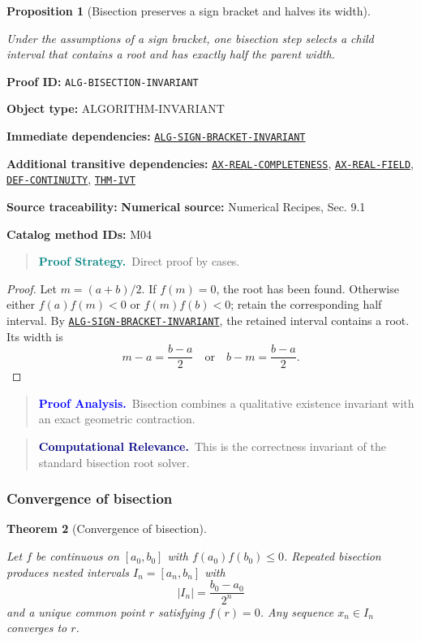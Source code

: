 \documentclass[10pt]{article}
\newcommand{\pidraw}[1]{\begingroup\urlstyle{tt}\nolinkurl{#1}\endgroup}
\newcommand{\pidref}[1]{\hyperref[prf:#1]{\pidraw{#1}}}
\newcommand{\pid}[1]{\pidref{#1}}
\newtheorem{theorem}{Theorem}[section]
\newtheorem{proposition}[theorem]{Proposition}
\theoremstyle{definition}
\theoremstyle{remark}
\newenvironment{proofstrategy}
{\begin{quote}\small\noindent\textbf{\textcolor{teal}{Proof Strategy.}}\ }
{\end{quote}}
\newenvironment{proofanalysis}
{\begin{quote}\small\noindent\textbf{\textcolor{blue}{Proof Analysis.}}\ }
{\end{quote}}
\newenvironment{computationalrelevance}
{\begin{quote}\small\noindent\textbf{\textcolor{navy}{Computational Relevance.}}\ }
{\end{quote}}
\newcommand{\meta}[2]{\noindent\textbf{#1:} #2\par}
\begin{document}
\begin{proposition}[Bisection preserves a sign bracket and halves its width]\label{prf:ALG-BISECTION-INVARIANT}

Under the assumptions of a sign bracket, one bisection step selects a child interval that contains a root and has exactly half the parent width.

\end{proposition}

\meta{Proof ID}{\pidraw{ALG-BISECTION-INVARIANT}}
\meta{Object type}{ALGORITHM-INVARIANT}
\meta{Immediate dependencies}{\pidref{ALG-SIGN-BRACKET-INVARIANT}}
\meta{Additional transitive dependencies}{\pidref{AX-REAL-COMPLETENESS}, \pidref{AX-REAL-FIELD}, \pidref{DEF-CONTINUITY}, \pidref{THM-IVT}}
\meta{Source traceability}{\textbf{Numerical source:} Numerical Recipes, Sec. 9.1}
\meta{Catalog method IDs}{M04}

\begin{proofstrategy}Direct proof by cases.\end{proofstrategy}

\begin{proof}

Let $m=(a+b)/2$. If $f(m)=0$, the root has been found. Otherwise either
$f(a)f(m)<0$ or $f(m)f(b)<0$; retain the corresponding half interval.
By \pid{ALG-SIGN-BRACKET-INVARIANT}, the retained interval contains a root.
Its width is
\[
m-a=\frac{b-a}{2}
\quad\text{or}\quad
b-m=\frac{b-a}{2}.
\]

\end{proof}

\begin{proofanalysis}Bisection combines a qualitative existence invariant with an exact geometric contraction.\end{proofanalysis}

\begin{computationalrelevance}This is the correctness invariant of the standard bisection root solver.\end{computationalrelevance}

\subsubsection{Convergence of bisection}

\begin{theorem}[Convergence of bisection]\label{prf:CONV-BISECTION}

Let $f$ be continuous on $[a_0,b_0]$ with $f(a_0)f(b_0)\le0$. Repeated bisection produces nested intervals $I_n=[a_n,b_n]$ with
\[
|I_n|=\frac{b_0-a_0}{2^n}
\]
and a unique common point $r$ satisfying $f(r)=0$. Any sequence $x_n\in I_n$ converges to $r$.

\end{theorem}
\end{document}

